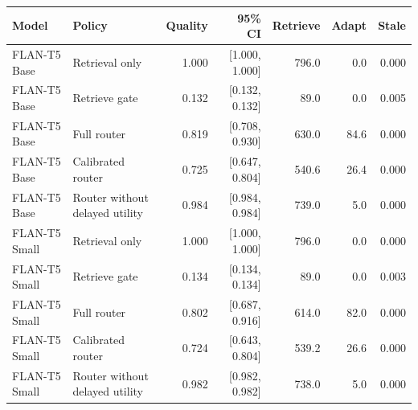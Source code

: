 \begin{tabular}{llrrrrr}
\toprule
Model & Policy & Quality & 95\% CI & Retrieve & Adapt & Stale \\
\midrule
FLAN-T5 Base & Retrieval only & 1.000 & [1.000, 1.000] & 796.0 & 0.0 & 0.000 \\
FLAN-T5 Base & Retrieve gate & 0.132 & [0.132, 0.132] & 89.0 & 0.0 & 0.005 \\
FLAN-T5 Base & Full router & 0.819 & [0.708, 0.930] & 630.0 & 84.6 & 0.000 \\
FLAN-T5 Base & Calibrated router & 0.725 & [0.647, 0.804] & 540.6 & 26.4 & 0.000 \\
FLAN-T5 Base & Router without delayed utility & 0.984 & [0.984, 0.984] & 739.0 & 5.0 & 0.000 \\
FLAN-T5 Small & Retrieval only & 1.000 & [1.000, 1.000] & 796.0 & 0.0 & 0.000 \\
FLAN-T5 Small & Retrieve gate & 0.134 & [0.134, 0.134] & 89.0 & 0.0 & 0.003 \\
FLAN-T5 Small & Full router & 0.802 & [0.687, 0.916] & 614.0 & 82.0 & 0.000 \\
FLAN-T5 Small & Calibrated router & 0.724 & [0.643, 0.804] & 539.2 & 26.6 & 0.000 \\
FLAN-T5 Small & Router without delayed utility & 0.982 & [0.982, 0.982] & 738.0 & 5.0 & 0.000 \\
\bottomrule
\end{tabular}

